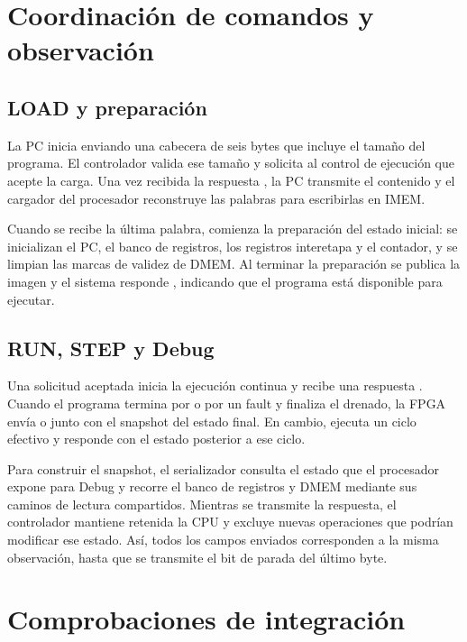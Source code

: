 \section{Coordinación de comandos y observación}

\subsection{LOAD y preparación}

La PC inicia  enviando una cabecera de seis bytes que incluye el
tamaño del programa. El controlador valida ese tamaño y solicita al control
de ejecución que acepte la carga. Una vez recibida la respuesta
, la PC transmite el contenido y el cargador del procesador
reconstruye las palabras para escribirlas en IMEM.

Cuando se recibe la última palabra, comienza la preparación del estado
inicial: se inicializan el PC, el banco de registros, los registros interetapa
y el contador, y se limpian las marcas de validez de DMEM. Al terminar la
preparación se publica la imagen y el sistema responde , indicando
que el programa está disponible para ejecutar.

\subsection{RUN, STEP y Debug}

Una solicitud  aceptada inicia la ejecución continua y recibe una
respuesta . Cuando el programa termina por  o por un
fault y finaliza el drenado, la FPGA envía  o  junto
con el snapshot del estado final. En cambio,  ejecuta un ciclo
efectivo y responde  con el estado posterior a ese ciclo.

Para construir el snapshot, el serializador consulta el estado que el
procesador expone para Debug y recorre el banco de registros y DMEM mediante
sus caminos de lectura compartidos. Mientras se transmite la respuesta, el
controlador mantiene retenida la CPU y excluye nuevas operaciones que podrían
modificar ese estado. Así, todos los campos enviados corresponden a la misma
observación, hasta que se transmite el bit de parada del último byte.

\section{Comprobaciones de integración}

